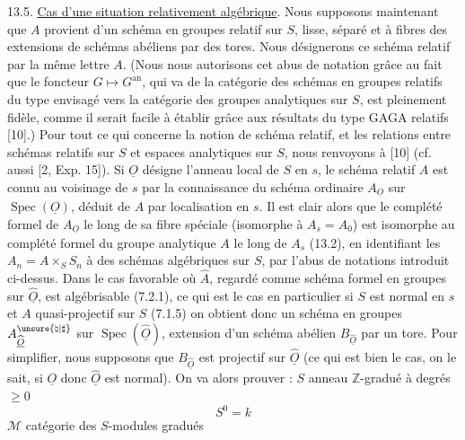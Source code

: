 13.5. \uline{Cas d'une situation relativement algébrique}. Nous supposons maintenant que $A$ provient d'un schéma en groupes relatif sur $S$, lisse, séparé et à fibres des extensions de schémas abéliens par des tores. Nous désignerons ce schéma relatif par la même lettre $A$. (Nous nous autorisons cet abus de notation grâce au fait que le foncteur $G\longmapsto G^{\mathrm{an}}$, qui va de la catégorie des schémas en groupes relatifs du type envisagé vers la catégorie des groupes analytiques sur $S$, est pleinement fidèle, comme il serait facile à établir grâce aux résultats du type GAGA relatifs [10].) Pour tout ce qui concerne la notion de schéma relatif, et les relations entre schémas relatifs sur $S$ et espaces analytiques sur $S$, nous renvoyons à [10] (cf. aussi [2, Exp. 15]). Si $\underline O$ désigne l'anneau local de $S$ en $s$, le schéma relatif $A$ est connu au voisinage de $s$ par la connaissance du schéma ordinaire $A_{\underline O}$ sur $\operatorname{Spec}(\underline O)$, déduit de $A$ par localisation en $s$. Il est clair alors que le complété formel de $A_{\underline O}$ le long de sa fibre spéciale (isomorphe à $A_s=A_0$) est isomorphe au complété formel du groupe analytique $A$ le long de $A_s$ (13.2), en identifiant les $A_n=A\times_S S_n$ à des schémas algébriques sur $S$, par l'abus de notations introduit ci-dessus. Dans le cas favorable où $\widehat A$, regardé comme schéma formel en groupes sur $\widehat{\underline O}$, est algébrisable (7.2.1), ce qui est le cas en particulier si $S$ est normal en $s$ et $A$ quasi-projectif sur $S$ (7.1.5) on obtient donc un schéma en groupes $A_{\widehat{\underline O}}^{\unsure{\natural|\sharp}}$ sur $\operatorname{Spec}(\widehat{\underline O})$, extension d'un schéma abélien $B_{\widehat{\underline O}}$ par un tore. Pour simplifier, nous supposons que $B_{\widehat{\underline O}}$ est projectif sur $\widehat{\underline O}$ (ce qui est bien le cas, on le sait, si $\underline O$ donc $\widehat{\underline O}$ est normal). On va alors prouver :
$S$ anneau $\mathbb Z$-gradué  à degrés $\geq0$
\[
S^0=k
\]
$\mathcal M$ catégorie des $S$-modules gradués

